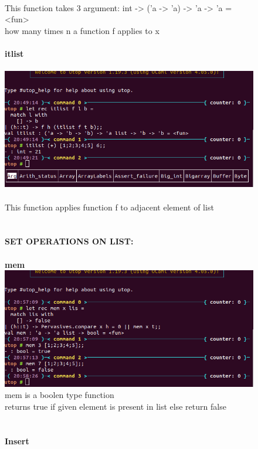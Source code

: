 \documentclass[15]{article}
\begin{document}
\begin{figure}
\\
This function takes 3 argument: int -> ('a -> 'a) -> 'a -> 'a = <fun>\\
how many times n a function f applies to x
\\
\\
\textbf{itlist}
\\
\\
\includegraphics[scale = .5]{images/image2.png}
\\
\\
This function applies function f to adjacent element of list\\
\\
\\
\textbf{SET OPERATIONS ON LIST:
}\\
\\
\textbf{mem}\\
\includegraphics[scale = .5]{images/image7.png}
\\
mem is a boolen type function\\
returns true if given element is present in list else return false\\
\\
\\
\textbf{Insert}\\
\\
\\

\end{figure}
\end{document}
